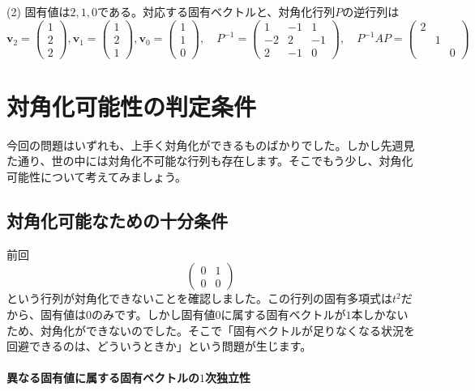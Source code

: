 \noindent (2) 固有値は$2, 1, 0$である。対応する固有ベクトルと、対角化行列$P$の逆行列は
\[
\bm{v}_{2} = 
\begin{pmatrix}
1 \\
2 \\
2
\end{pmatrix}, 
\bm{v}_{1} = 
\begin{pmatrix}
1 \\
2 \\
1
\end{pmatrix}, 
\bm{v}_{0} = 
\begin{pmatrix}
1 \\
1 \\
0
\end{pmatrix}, \quad
P^{-1} = 
\begin{pmatrix}
1 & -1 & 1 \\
-2 & 2 & -1 \\
2 & -1 & 0
\end{pmatrix}, \quad
P^{-1} AP =
\begin{pmatrix}
2 \\
 & 1 \\
 & & 0
\end{pmatrix}
\]

\section{対角化可能性の判定条件}

今回の問題はいずれも、上手く対角化ができるものばかりでした。しかし先週見た通り、世の中には対角化不可能な行列も存在します。そこでもう少し、対角化可能性について考えてみましょう。

\subsection{対角化可能なための十分条件}

前回
\[
\begin{pmatrix}
0 & 1 \\
0 & 0
\end{pmatrix}
\]
という行列が対角化できないことを確認しました。この行列の固有多項式は$t^2$だから、固有値は$0$のみです。しかし固有値$0$に属する固有ベクトルが$1$本しかないため、対角化ができないのでした。そこで「固有ベクトルが足りなくなる状況を回避できるのは、どういうときか」という問題が生じます。

\paragraph{異なる固有値に属する固有ベクトルの$1$次独立性}

